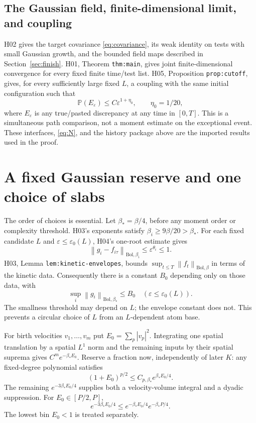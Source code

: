 \documentclass[11pt]{article}
\newcommand{\Prob}{\mathbb P}
\newcommand{\eps}{\varepsilon}
\newcommand{\Bol}{\mathrm{Bol}}
\newcommand{\norm}[1]{\left\|#1\right\|}
\theoremstyle{definition}\newtheorem{definition}[theorem]{Definition}
\theoremstyle{remark}\newtheorem{remark}[theorem]{Remark}
\numberwithin{equation}{section}
\begin{document}
\subsection{The Gaussian field, finite-dimensional limit, and coupling}
H02 gives the target covariance \eqref{eq:covariance}, its weak identity on
tests with small Gaussian growth, and the bounded field maps described in
Section~\ref{sec:finish}. H01, Theorem \texttt{thm:main}, gives joint
finite-dimensional convergence for every fixed finite time/test list.
H05, Proposition \texttt{prop:cutoff}, gives, for every sufficiently large
fixed $L$, a coupling with the same initial configuration such that
\begin{equation}\label{eq:coupling}
 \Prob(E_\eps)\le C\eps^{1+\eta_0},\qquad \eta_0=1/20,
\end{equation}
where $E_\eps$ is any true/pasted discrepancy at any time in $[0,T]$.
This is a simultaneous path comparison, not a moment estimate on the
exceptional event. These interfaces, \eqref{eq:N}, and the history package
above are the imported results used in the proof.

\section{A fixed Gaussian reserve and one choice of slabs}\label{sec:budget}
The order of choices is essential. Let $\beta_*=\beta/4$, before any moment
order or complexity threshold. H03's exponents satisfy
$\beta_i\ge9\beta/20>\beta_*$. For each fixed candidate $L$ and
$\eps\le\eps_0(L)$, H04's one-root estimate gives
\[
 \norm{g_i-f_{i\tau}}_{\Bol,\beta_i}\le\eps^{\theta_i}\le1.
\]
H03, Lemma \texttt{lem:kinetic-envelopes}, bounds
$\sup_{t\le T}\norm{f_t}_{\Bol,\beta}$ in terms of the kinetic data.
Consequently there is a constant $B_0$ depending only on those data, with
\begin{equation}\label{eq:uniform-envelope}
 \sup_i\norm{g_i}_{\Bol,\beta_*}\le B_0
       \quad (\eps\le\eps_0(L)).
\end{equation}
The smallness threshold may depend on $L$; the envelope constant does not.
This prevents a circular choice of $L$ from an $L$-dependent atom base.

For birth velocities $v_1,\ldots,v_m$ put $E_0=\sum_p|v_p|^2$. Integrating
one spatial translation by a spatial $L^1$ norm and the remaining inputs
by their spatial suprema gives $C^m e^{-\beta_*E_0}$.
Reserve a fraction now, independently of later $K$: any fixed-degree
polynomial satisfies
\begin{equation}\label{eq:polyabsorb}
 (1+E_0)^{p/2}\le C_{p,\beta_*}e^{\beta_*E_0/4}.
\end{equation}
The remaining $e^{-3\beta_*E_0/4}$ supplies both a velocity-volume integral
and a dyadic suppression. For $E_0\in[P/2,P]$,
\begin{equation}\label{eq:reserve}
 e^{-3\beta_*E_0/4}
       \le e^{-\beta_*E_0/4}e^{-\beta_*P/4}.
\end{equation}
The lowest bin $E_0<1$ is treated separately.
\end{document}
